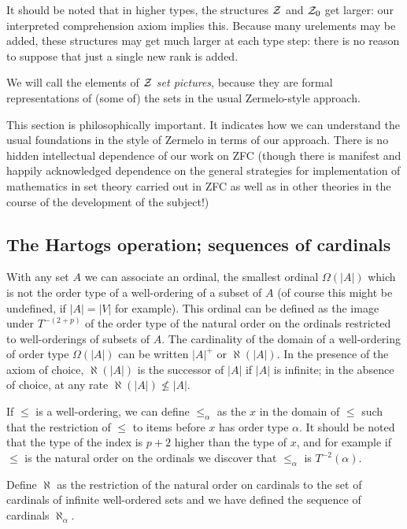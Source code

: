 \documentclass[12pt]{article}
\begin{document}
It should be noted that in higher types, the structures $\cal Z$ and ${\cal Z}_0$ get larger:  our interpreted comprehension axiom implies this.  Because many  urelements may be added, these structures may get much larger at each type step:  there is no reason to suppose that just a single new rank is added.

We will call the elements of $\cal Z$ {\em set pictures\/}, because they are formal representations of (some of) the sets in the usual Zermelo-style approach.

This section is philosophically important.  It indicates how we can understand the usual foundations in the style of Zermelo in terms of our approach.  There is no hidden intellectual dependence of our work on ZFC (though there is manifest and happily acknowledged dependence on the general strategies for implementation of mathematics in set theory carried out in ZFC as well as in other theories in the course of the development of the subject!)

\subsection{The Hartogs operation;  sequences of cardinals}

With any set $A$ we can associate an ordinal, the smallest ordinal $\Omega(|A|)$ which is not the order type of a well-ordering of a subset of $A$ (of course this might be undefined, if $|A|=|V|$ for example).  This ordinal
can be defined as the image under $T^{-(2+p)}$ of the order type of the natural order on the ordinals restricted to well-orderings of subsets of $A$.  The cardinality of the domain of a well-ordering of order type
$\Omega(|A|)$ can be written $|A|^+$ or $\aleph(|A|)$.  In the presence of the axiom of choice, $\aleph(|A|)$ is the successor of $|A|$ if $|A|$ is infinite;  in the absence of choice, at any rate $\aleph(|A|) \not\leq |A|$.

If $\leq$ is a well-ordering, we can define $\leq_{\alpha}$ as the $x$ in the domain of $\leq$ such that the restriction of $\leq$ to items before $x$ has order type $\alpha$.  It should be noted that the type of the index
is $p+2$ higher than the type of $x$, and for example if $\leq$ is the natural order on the ordinals we discover that $\leq_{\alpha}$ is $T^{-2}(\alpha)$.

Define $\aleph$ as the restriction of the natural order on cardinals to the set of cardinals of infinite well-ordered sets  and we have defined the sequence of cardinals $\aleph_\alpha$.
\end{document}
